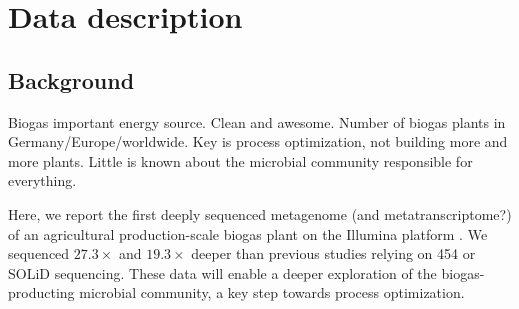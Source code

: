 \documentclass{bmcart}
\begin{document}


\section*{Data description}
%
\subsection*{Background}
Biogas important energy source. Clean and awesome.
Number of biogas plants in Germany/Europe/worldwide.
Key is process optimization, not building more and more plants.
Little is known about the microbial community responsible for everything.

Here, we report the first deeply sequenced metagenome (and metatranscriptome?) of an agricultural production-scale biogas plant on the Illumina platform \cite{GigaScience}.
We sequenced $27.3 \times$ and $19.3 \times$ deeper than previous studies relying on 454 \cite{Jaenicke2011} or SOLiD \cite{Wirth2012} sequencing.
These data will enable a deeper exploration of the biogas-producting microbial community, a key step towards process optimization.
%
\end{document}
